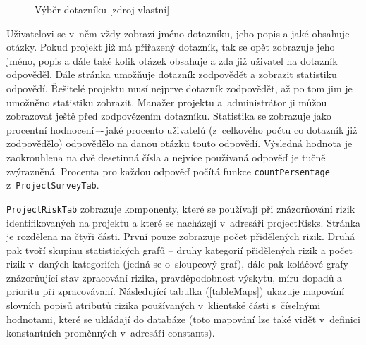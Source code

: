     \begin{figure}[!htbp]
    \begin{center}
    \caption{Výběr dotazníku [zdroj vlastní]}
    \label{addDotaznik}
    \end{center}
    \end{figure}
    
Uživatelovi se v~něm vždy zobrazí jméno dotazníku, jeho popis a jaké obsahuje otázky. Pokud projekt již má přiřazený dotazník, tak se opět zobrazuje jeho jméno, popis a dále také kolik otázek obsahuje a zda již uživatel na dotazník odpověděl. Dále stránka umožňuje dotazník zodpovědět a zobrazit statistiku odpovědí. Řešitelé projektu musí nejprve dotazník zodpovědět, až po tom jim je umožněno statistiku zobrazit. Manažer projektu a~administrátor ji můžou zobrazovat ještě před zodpovězením dotazníku. Statistika se zobrazuje jako procentní hodnocení\,–-\,jaké procento uživatelů (z~celkového počtu co dotazník již zodpovědělo) odpovědělo na danou otázku touto odpovědí. Výsledná hodnota je zaokrouhlena na dvě desetinná čísla a nejvíce používaná odpověď je tučně zvýrazněná. Procenta pro každou odpověď počítá funkce \texttt{countPersentage} z~\texttt{ProjectSurveyTab}.
    
\texttt{ProjectRiskTab} zobrazuje komponenty, které se používají při znázorňování rizik identifikovaných na projektu a které se nacházejí v~adresáři projectRisks. Stránka je rozdělena na čtyři části. První pouze zobrazuje počet přidělených rizik. Druhá pak tvoří skupinu statistických grafů – druhy kategorií přidělených rizik a počet rizik v~daných kategoriích (jedná se o~sloupcový graf), dále pak koláčové grafy znázorňující stav zpracování rizika, pravděpodobnost výskytu, míru dopadů a prioritu při zpracovávaní. Následující tabulka (\ref{tableMaps}) ukazuje mapování slovních popisů atributů rizika používaných v~klientské části s~číselnými hodnotami, které se ukládají do databáze (toto mapování lze také vidět v~definici konstantních proměnných v~adresáři constants).

